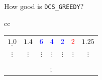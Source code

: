 \documentclass[final,t]{beamer}
\begin{document}
\begin{frame}{}
\begin{columns}[t]
\begin{column}{.30\linewidth}
\begin{block}{How good is {\tt DCS\_GREEDY}?}
\begin{center}
\begin{tabular}{cc}
\begin{tabular}[c]{cc|c|ccc|c}
 {$\underline{1.0}$ } &  {$1.4$} & {\textcolor{blue}{$6$}} &     {\textcolor{blue}{4}} & {\textcolor{blue}{2}}&  {\textcolor{red}{2}} & $1.25$\\  
$\vdots$ & $\vdots$               &  $\vdots$                   & $\vdots$ &                                     $\vdots$ & $\vdots$ & $\vdots$ \\  \hline
  \\
   \multicolumn{7}{c}{\tikz \node [fill=tangocolorlightaluminium]  {\Large $ \delta_{DCS} \le 2 r_{\max} \delta_{\tt GREEDY}$ } ; } 
 \end{tabular}


\end{tabular}

\end{center}
\end{block}


\newcommand{\gsq}{\textcolor{green}{$\blacksquare$}}
\newcommand{\ysq}{\textcolor{yellow}{$\blacksquare$}}
\newcommand{\rsq}{\textcolor{red}{$\blacksquare$}}
\newcommand{\bsq}{{$\blacksquare$}}


\end{column}
\end{columns}
\end{frame}
\end{document}
